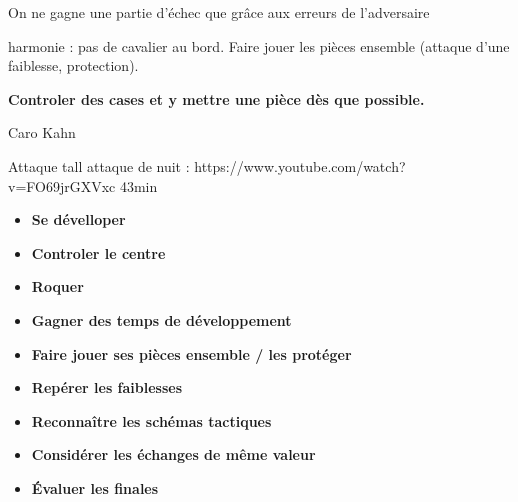 On ne gagne une partie d'échec que grâce aux erreurs de l'adversaire

harmonie : pas de cavalier au bord. Faire jouer les pièces ensemble (attaque d'une faiblesse, protection).



{\bf Controler des cases et y mettre une pièce dès que possible.}


Caro Kahn

Attaque tall attaque de nuit : https://www.youtube.com/watch?v=FO69jrGXVxc 43min



\begin{itemize}[leftmargin=2.7cm, label=, itemsep=0pt]%
\item  {\bf Se dévelloper}
\item  {\bf Controler le centre}
\item  {\bf Roquer}
\end{itemize}

\begin{itemize}[leftmargin=2.7cm, label=, itemsep=0pt]%
\item  {\bf Gagner des  temps de développement}
\item  {\bf Faire jouer ses pièces ensemble / les protéger}
\end{itemize}

\begin{itemize}[leftmargin=2.7cm, label=, itemsep=0pt]%
\item  {\bf Repérer les faiblesses}
\item  {\bf Reconnaître les schémas tactiques}
\item  {\bf Considérer les échanges de même valeur}
\item  {\bf Évaluer les finales}
\end{itemize}


